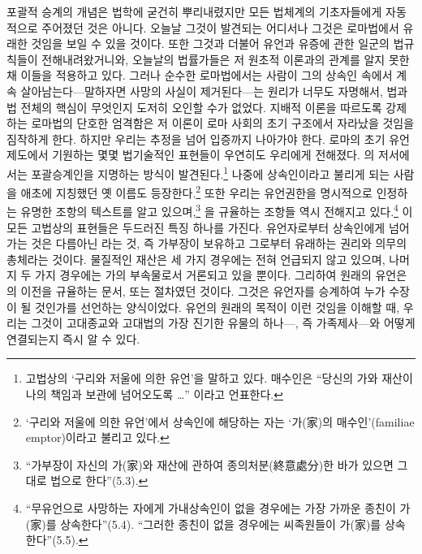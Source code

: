 포괄적 승계의 개념은 법학에 굳건히 뿌리내렸지만
모든 법체계의 기초자들에게 자동적으로 주어졌던 것은 아니다.
오늘날 그것이 발견되는 어디서나 그것은 로마법에서 유래한 것임을
보일 수 있을 것이다.
또한 그것과 더불어 유언과 유증에 관한 일군의 법규칙들이 전해내려왔거니와,
오늘날의 법률가들은 저 원초적 이론과의 관계를 알지 못한 채 이들을 적용하고 있다.
그러나 순수한 로마법에서는 사람이 그의 상속인 속에서
계속 살아남는다---말하자면 사망의 사실이 제거된다---는
원리가 너무도 자명해서, 법과 법 전체의 핵심이
무엇인지 도저히 오인할 수가 없었다.
지배적 이론을 따르도록 강제하는 로마법의 단호한 엄격함은
저 이론이 로마 사회의 초기 구조에서 자라났을 것임을 짐작하게 한다.
하지만 우리는 추정을 넘어 입증까지 나아가야 한다.
로마의 초기 유언 제도에서 기원하는
몇몇 법기술적인 표현들이 우연히도 우리에게 전해졌다.
의 저서에서는 포괄승계인을 지명하는 방식이
발견된다.\footnote{%
  고법상의 `구리와 저울에 의한 유언'을 말하고 있다.
  매수인은 ``당신의 가와 재산이 나의 책임과 보관에 넘어오도록 \ldots''
  이라고 언표한다. }
나중에 상속인이라고 불리게 되는 사람을 애초에 지칭했던 옛 이름도
등장한다.\footnote{%
  `구리와 저울에 의한 유언'에서
  상속인에 해당하는 자는 `가(家)의 매수인'(familiae emptor)이라고
  불리고 있다. }
또한 우리는 유언권한을 명시적으로 인정하는
유명한  조항의 텍스트를 알고 있으며,\footnote{%
  ``가부장이 자신의 가(家)와 재산에 관하여 종의처분(終意處分)한 바가 있으면
  그대로 법으로 한다''(5.3). }
을 규율하는 조항들 역시 전해지고 있다.\footnote{``무유언으로
  사망하는 자에게 가내상속인이 없을 경우에는 가장 가까운 종친이
  가(家)를 상속한다''(5.4).
  ``그러한 종친이 없을 경우에는 씨족원들이 가(家)를 상속한다''(5.5). }
이 모든 고법상의 표현들은 두드러진 특징 하나를 가진다.
유언자로부터 상속인에게 넘어가는 것은 다름아닌 라는 것,
즉 가부장이 보유하고 그로부터 유래하는 권리와 의무의 총체라는 것이다.
물질적인 재산은 세 가지 경우에는 전혀 언급되지 않고 있으며,
나머지 두 가지 경우에는 가의 부속물로서 거론되고 있을 뿐이다.
그리하여 원래의 유언은 의 이전을 규율하는 문서,
또는  절차였던 것이다.
그것은 유언자를 승계하여 누가 수장이 될 것인가를 선언하는
양식이었다.
유언의 원래의 목적이 이런 것임을 이해할 때,
우리는 그것이 고대종교와 고대법의 가장 진기한 유물의
하나---, 즉 가족제사---와
어떻게 연결되는지 즉시 알 수 있다.
